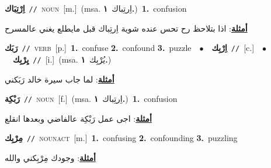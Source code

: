 \documentclass[10pt,a4paper,twoside]{article} %
\begin{document}
\begin{multicols}{2}
{\setlength\topsep{0pt}\textbf{\foreignlanguage{arabic}{اِرْتِبَاك}}\ {\color{gray}\texttt{//}\color{black}}\ \textsc{noun}\ [m.]\ \color{gray}(msa. \foreignlanguage{arabic}{اِرتِباك}~\foreignlanguage{arabic}{\textbf{١.}})\color{black}\ \textbf{1.}~confusion\  \begin{flushright}\color{gray}\foreignlanguage{arabic}{\textbf{\underline{\foreignlanguage{arabic}{أمثلة}}}: اذا بتلاحظ رح تحس عنده شوية اِرتِباك قبل مايطلع يغني عالمسرح}\end{flushright}\color{black}} \vspace{2mm}

{\setlength\topsep{0pt}\textbf{\foreignlanguage{arabic}{رَبَك}}\ {\color{gray}\texttt{//}\color{black}}\ \textsc{verb}\ [p.]\ \textbf{1.}~confuse  \textbf{2.}~confound  \textbf{3.}~puzzle\ \ $\bullet$\ \ \setlength\topsep{0pt}\textbf{\foreignlanguage{arabic}{اِرْبِك}}\ {\color{gray}\texttt{//}\color{black}}\ [c.]\ \ $\bullet$\ \ \setlength\topsep{0pt}\textbf{\foreignlanguage{arabic}{يِرْبِك}}\ {\color{gray}\texttt{//}\color{black}}\ [i.]\ \color{gray}(msa. \foreignlanguage{arabic}{يُرْبِك}~\foreignlanguage{arabic}{\textbf{١.}})\color{black}\  \begin{flushright}\color{gray}\foreignlanguage{arabic}{\textbf{\underline{\foreignlanguage{arabic}{أمثلة}}}: لما جاب سيرة خالد رَبَكني}\end{flushright}\color{black}} \vspace{2mm}

{\setlength\topsep{0pt}\textbf{\foreignlanguage{arabic}{رَبْكِة}}\ {\color{gray}\texttt{//}\color{black}}\ \textsc{noun}\ [f.]\ \color{gray}(msa. \foreignlanguage{arabic}{اِرتِباك}~\foreignlanguage{arabic}{\textbf{١.}})\color{black}\ \textbf{1.}~confusion\  \begin{flushright}\color{gray}\foreignlanguage{arabic}{\textbf{\underline{\foreignlanguage{arabic}{أمثلة}}}: اجى عمل رَبْكِة عالفاضي وبعدها انقلع}\end{flushright}\color{black}} \vspace{2mm}

{\setlength\topsep{0pt}\textbf{\foreignlanguage{arabic}{مِرْبِك}}\ {\color{gray}\texttt{//}\color{black}}\ \textsc{noun\textunderscore act}\ [m.]\ \textbf{1.}~confusing  \textbf{2.}~confounding  \textbf{3.}~puzzling\  \begin{flushright}\color{gray}\foreignlanguage{arabic}{\textbf{\underline{\foreignlanguage{arabic}{أمثلة}}}: وجودك مِرْبِكني والله}\end{flushright}\color{black}} \vspace{2mm}


\end{multicols}
\end{document}
